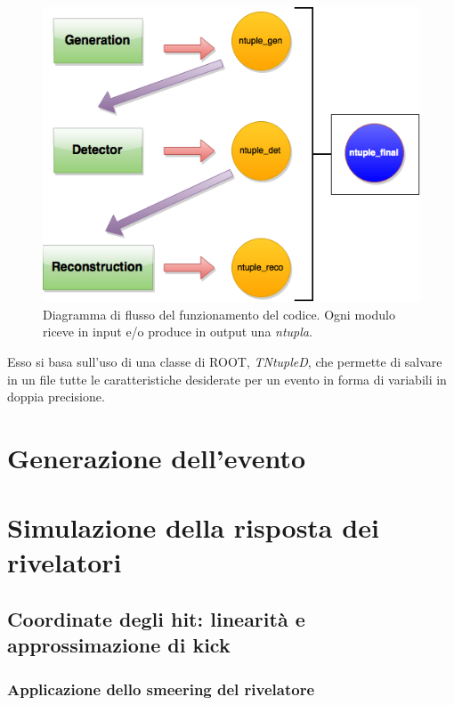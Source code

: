 \documentclass[8pt]{extarticle}
\begin{document}
\begin{figure}
	\begin{center}
		\includegraphics[scale=0.4]{script_structure}
		\caption{Diagramma di flusso del funzionamento del codice. Ogni modulo riceve in input e/o produce in output una \textit{ntupla}.}
		\label{fig:script_structure}
	\end{center}
\end{figure}

Esso si basa sull'uso di una classe di ROOT, \textit{TNtupleD}, che permette di salvare in un file tutte le caratteristiche desiderate per un evento in forma di variabili in doppia precisione.

\section{Generazione dell'evento} \label{sec:generation}

\section{Simulazione della risposta dei rivelatori} \label{sec:detector}
\subsection{Coordinate degli hit: linearità e approssimazione di kick}
\subsubsection{Applicazione dello smeering del rivelatore}
\end{document}
